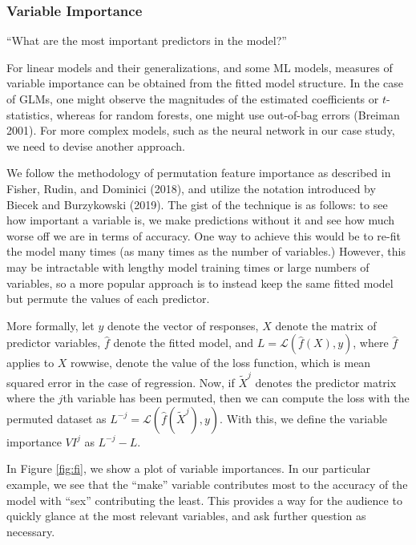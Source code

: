 \documentclass[preprint, 3p, twocolumn, letterpaper, 10pt]{elsarticle} %
\begin{document}
\hypertarget{variable-importance}{%
\subsubsection{Variable Importance}\label{variable-importance}}

``What are the most important predictors in the model?''

For linear models and their generalizations, and some ML models, measures of
variable importance can be obtained from the fitted model structure. In the
case of GLMs, one might observe the magnitudes of the estimated coefficients or
\(t\)-statistics, whereas
for random forests, one might use out-of-bag errors (Breiman 2001).
For more complex models, such as the neural network in our case study, we need
to devise another approach.

We follow the methodology of permutation feature importance as described in
Fisher, Rudin, and Dominici (2018), and utilize the notation introduced by Biecek and Burzykowski (2019).
The gist of the technique is as follows: to see how important a variable is,
we make predictions without it and see how much worse off we are in terms of
accuracy. One way to achieve this would be to re-fit the model many times (as
many times as the number of variables.) However, this may be intractable with
lengthy model training times or large numbers of variables, so a more popular
approach is to instead keep the same fitted model but permute the values of each
predictor.

More formally, let \(y\) denote the vector of responses, \(X\) denote the matrix of
predictor variables, \(\widehat{f}\) denote the fitted model, and
\(L = \mathcal{L}(\widehat{f}(X), y)\), where \(\widehat{f}\) applies to \(X\)
rowwise, denote the value of the loss function, which is mean squared error
in the case of regression. Now, if \(\widetilde{X}^{j}\) denotes the predictor
matrix where the \(j\)th variable has been permuted, then we can compute the
loss with the permuted dataset as
\(L^{-j} = \mathcal{L}(\widehat{f}(\widetilde{X}^{j}), y)\). With this, we define
the variable importance \(VI^{j}\) as \(L^{-j} - L\).

In Figure \ref{fig:fi}, we show a plot of variable importances. In our
particular example, we see that the ``make'' variable contributes most to the
accuracy of the model with ``sex'' contributing the least. This provides a way
for the audience to quickly glance at the most relevant variables, and ask
further question as necessary.
\end{document}
